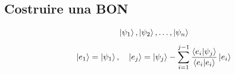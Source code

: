 \subsection{Costruire una BON}
\[
  \ket{\psi_1}, \ket{\psi_2}, \dots, \ket{\psi_n}
\]
\[
  \ket{e_1} = \ket{\psi_1},
  \quad
  \ket{e_j} = \ket{\psi_j} - \sum_{i = 1}^{j - 1}
    \frac{\braket{e_i|\psi_j}}{\braket{e_i|e_i}} \ket{e_i}
\]
